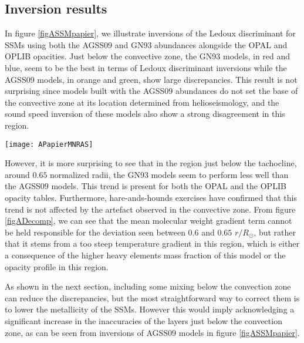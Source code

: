 \documentclass[a4paper,fleqn,usenatbib]{mnras}
\begin{document}
\subsection{Inversion results}

In figure \ref{figASSMpapier}, we illustrate inversions of the Ledoux discriminant for SSMs using both the AGSS09 and GN93 abundances alongside the OPAL and OPLIB opacities. Just below the convective zone, the GN93 models, in red and blue, seem to be the best in terms of Ledoux discriminant inversions while the AGSS09 models, in orange and green, show large discrepancies. This result is not surprising since models built with the AGSS09 abundances do not set the base of the convective zone at its location determined from helioseismology, and the sound speed inversion of these models also show a strong disagreement in this region. 

\begin{figure*}
	\centering
		\texttt{[image: APapierMNRAS]}
	\caption{Effects of the opacities on the Ledoux discriminant profile of SSMs. The orange and green symbols are related to SSMs built with the AGSS$09$ abundances and the OPAL and OPLIB opacity tables, respectively. The red and blue symbols are related to the GN$93$ SSMs. Horizontal error bars show the interquartile width of the averaging kernels while the vertical error bars are the 1$\sigma$ errors from the propagation of the observational 1$\sigma$ errors.}
		\label{figASSMpapier}
\end{figure*}

However, it is more surprising to see that in the region just below the tachocline, around $0.65$ normalized radii, the GN$93$ models seem to perform less well than the AGSS$09$ models. This trend is present for both the OPAL and the OPLIB opacity tables. Furthermore, hare-ands-hounds exercises have confirmed that this trend is not affected by the artefact observed in the convective zone. From figure \ref{figADecomp}, we can see that the mean molecular weight gradient term cannot be held responsible for the deviation seen between $0.6$ and $0.65$ $r/R_{\odot}$, but rather that it stems from a too steep temperature gradient in this region, which is either a consequence of the higher heavy elements mass fraction of this model or the opacity profile in this region. 

As shown in the next section, including some mixing below the convection zone can reduce the discrepancies, but the most straightforward way to correct them is to lower the metallicity of the SSMs. However this would imply acknowledging a significant increase in the inaccuracies of the layers just below the convection zone, as can be seen from inversions of AGSS09 models in figure \ref{figASSMpapier}. 
\end{document}
